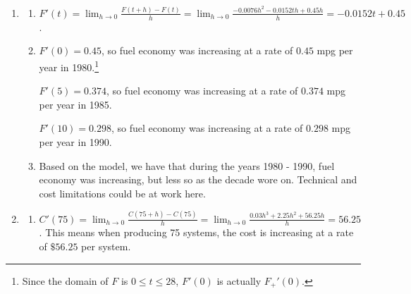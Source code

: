 \documentclass{ximera}
\begin{document}
\begin{enumerate}
\begin{enumerate}
\item  $v(t) = 0$  when $t = \frac{22.08}{32} = 0.69$.  This means the (vertical) velocity zeros out $0.69$ seconds after Jason lets go of the hammer.  In this scenario, this corresponds to when the hammer reaches its peak height

\item  We first find when the hammer hits the ground by solving $h(t) = 0$.  The positive answer here is   $t \approx 1.612$ seconds.  The velocity of the hammer is:  $v(1.612) = -32(1.612) + 22.08 = -29.504$.  The hammer hits the ground going (approximately) $29.504$ feet per second.\footnote{The negative `$-$' here on $v(1.612)$ indicates the hammer is heading \textbf{downwards} when it strikes the ground.}

\end{enumerate}

\item  \begin{enumerate}  \item  $F'(t) = \lim_{h \rightarrow 0} \frac{F(t + h) - F(t)}{h} = \lim_{h \rightarrow 0} \frac{-0.0076h^{2} -0.0152th+0.45h}{h} =-0.0152t + 0.45$.

\item   $F'(0) = 0.45$, so fuel economy was increasing at a rate of $0.45$ mpg per year in 1980.\footnote{Since the domain of $F$ is $0 \leq t \leq 28$, $F'(0)$ is actually $F_{+}'(0)$.}

\smallskip

 $F'(5) = 0.374$,  so fuel economy was increasing at a rate of $0.374$ mpg per year in 1985. 
 
 \smallskip
 
  $F'(10) = 0.298$,  so fuel economy was increasing at a rate of $0.298$ mpg  per year in 1990. 

\item  Based on the model, we have that during the years 1980 - 1990, fuel economy was increasing, but less so as the decade wore on.  Technical and cost limitations could be at work here.

\end{enumerate}

\item   \begin{enumerate}  \item   $C'(75) = \lim_{h \rightarrow 0} \frac{C(75+h) - C(75)}{h}  =     \lim_{h \rightarrow 0} \frac{0.03h^{3}+2.25h^{2}+56.25h}{h} = 56.25$.  This means when producing 75 systems, the cost is increasing at a rate of $\$ 56.25$ per system.


\end{enumerate}
\end{enumerate}
\end{document}
